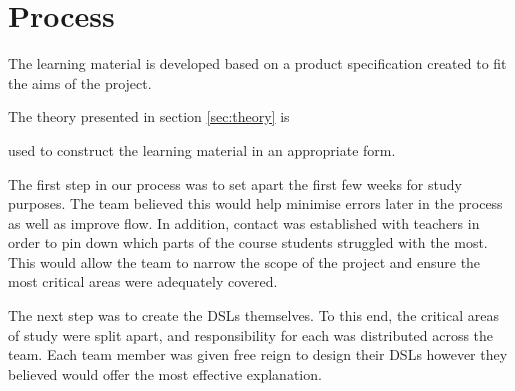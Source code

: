 \section{Process}\label{sec:process}







The learning material is developed based on a product specification created to fit the aims of the project. 
\begin{modtext}
The theory presented in section \ref{sec:theory} is
\end{modtext}
used to construct the learning material in an appropriate form.



\iffalse
The first step in our process was to set apart the first few weeks for study purposes. The team believed this would help minimise errors later in the process as well as improve flow. In addition, contact was established with teachers in order to pin down which parts of the course students struggled with the most. This would allow the team to narrow the scope of the project and ensure the most critical areas were adequately covered.

The next step was to create the DSLs themselves. To this end, the critical areas of study were split apart, and responsibility for each was distributed across the team. Each team member was given free reign to design their DSLs however they believed would offer the most effective explanation.

